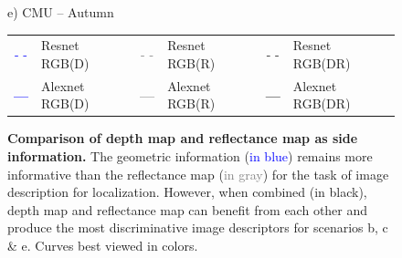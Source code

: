 \begin{figure}
\begin{minipage}{0.19\linewidth}
		e) CMU -- Autumn
	\end{minipage}
	
	\vspace{0.2cm}
	
	\begin{scriptsize}
	\begin{tabular}{c l c l c l }

		\textcolor{blue}{\Large{- -}} & Resnet RGB(D) & 
		\textcolor{gray}{\Large{- -}} & Resnet RGB(R) & 
		\Large{- -} & Resnet RGB(DR) \\
		\textcolor{blue}{\textbf{\Large{---}}} & Alexnet RGB(D) & 
		\textcolor{gray}{\textbf{\Large{---}}} & Alexnet RGB(R) &
		\textbf{\Large{---}} & Alexnet RGB(DR) \\
	\end{tabular}		
	\end{scriptsize}

	\caption[Comparison of depth map and reflectance map as side information]{\label{fig:ref_vs_depth} \textbf{Comparison of depth map and reflectance map as side information.} The geometric information (\textcolor{blue}{in blue}) remains more informative than the reflectance map (\textcolor{gray}{in gray}) for the task of image description for localization. However, when combined (in black), depth map and reflectance map can benefit from each other and produce the most discriminative image descriptors for scenarios b, c \& e. Curves best viewed in colors.}
\end{figure}